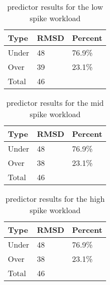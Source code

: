 \begin{table}[H]
\centering
\begin{tabular}{| l | l | l |}
\hline
Type & RMSD & Percent \\ \hline
Under & 48 & 76.9\% \\ \hline
Over & 39 & 23.1\% \\ \hline
Total & 46 & \\ \hline
\end{tabular}
\caption{predictor results for the low spike workload}
\end{table}

\begin{table}[H]
\centering
\begin{tabular}{| l | l | l |}
\hline
Type & RMSD & Percent \\ \hline
Under & 48 & 76.9\% \\ \hline
Over & 38 & 23.1\% \\ \hline
Total & 46 & \\ \hline
\end{tabular}
\caption{predictor results for the mid spike workload}
\end{table}

\begin{table}[H]
\centering
\begin{tabular}{| l | l | l |}
\hline
Type & RMSD & Percent \\ \hline
Under & 48 & 76.9\% \\ \hline
Over & 38 & 23.1\% \\ \hline
Total & 46 & \\ \hline
\end{tabular}
\caption{predictor results for the high spike workload}
\end{table}